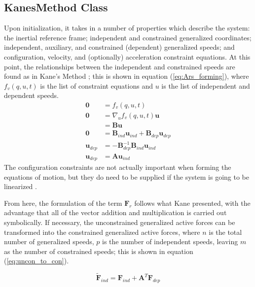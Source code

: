 \documentclass[twocolumn,10pt]{asme2e}
\begin{document}
\subsection*{KanesMethod Class}
Upon initialization, it takes in a number of properties which describe the
system: the inertial reference frame; independent and constrained generalized
coordinates; independent, auxiliary, and constrained (dependent) generalized
speeds; and configuration, velocity, and (optionally) acceleration constraint
equations. At this point, the relationships between the independent and
constrained speeds are found as in Kane's Method \cite{Kane1985}; this is shown
in equation (\ref{eq:Ars_forming}), where $f_v(q, u, t)$ is the list of
constraint equations and $u$ is the list of independent and dependent speeds.
\begin{align}
\mathbf{0} &= f_v(q, u, t) \\
\mathbf{0} &= \nabla_u f_v(q, u, t) \mathbf{u} \\
           &= \mathbf{B} \mathbf{u} \\
\mathbf{0} &= \mathbf{B}_{ind} \mathbf{u}_{ind} + \mathbf{B}_{dep}
\mathbf{u}_{dep} \\
\mathbf{u}_{dep} &= - \mathbf{B}_{dep}^{-1} \mathbf{B}_{ind} \mathbf{u}_{ind} \\
\mathbf{u}_{dep} &= \mathbf{A} \mathbf{u}_{ind}
\label{eq:Ars_forming}
\end{align}
The configuration constraints are not actually important when forming the
equations of motion, but they do need to be supplied if the system is going to
be linearized \cite{Peterson2013}.

From here, the formulation of the term $\mathbf{F}_r$ follows what Kane
presented, with the advantage that all of the vector addition and
multiplication is carried out symbolically.  If necessary, the unconstrained
generalized active forces can be transformed into the constrained generalized
active forces, where $n$ is the total number of generalized speeds, $p$ is the
number of independent speeds, leaving $m$ as the number of constrained speeds;
this is shown in equation (\ref{eq:uncon_to_con}).

\begin{equation}
\label{eq:uncon_to_con}
\tilde{\mathbf{F}}_{ind} = \mathbf{F}_{ind} + \mathbf{A}^{T}
\mathbf{F}_{dep}
\end{equation}
\end{document}
